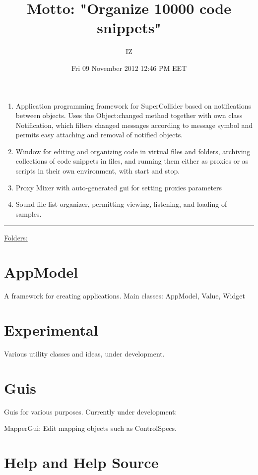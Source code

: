 \documentclass[11pt, a4paper]{scrartcl}
\begin{document}
\title{Motto: "Organize 10000 code snippets"}
\author{IZ}
\date{Fri 09 November 2012 12:46 PM EET}
\maketitle

\setcounter{tocdepth}{3}
\tableofcontents
\vspace*{1cm}


\begin{enumerate}
\item Application programming framework for SuperCollider based on notifications between objects. Uses the Object:changed method together with own class Notification, which filters changed messages according to message symbol and permits easy attaching and removal of notified objects.
\item Window for editing and organizing code in virtual files and folders, archiving collections of code snippets in files, and running them either as proxies or as scripts in their own environment, with start and stop.
\item Proxy Mixer with auto-generated gui for setting proxies parameters
\item Sound file list organizer, permitting viewing, listening, and loading of samples.
\end{enumerate}

\hrule

\underline{Folders:}

\section{AppModel}
\label{sec-1}


A framework for creating applications. Main classes:
AppModel, Value, Widget
\section{Εxperimental}
\label{sec-2}


Various utility classes and ideas, under development.
\section{Guis}
\label{sec-3}


Guis for various purposes. Currently under development: 

MapperGui: Edit mapping objects such as ControlSpecs. 
\section{Help and Help Source}
\label{sec-4}
\end{document}
